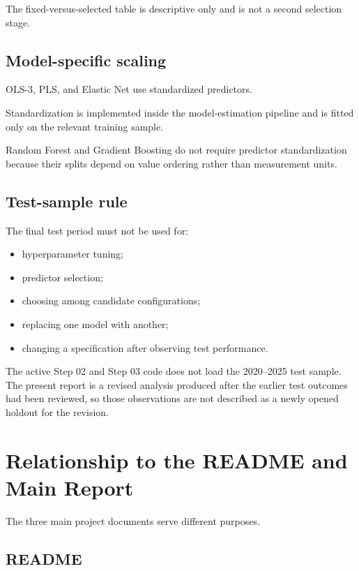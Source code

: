 \documentclass[11pt,a4paper]{article}
\begin{document}
The fixed-versus-selected table is descriptive only and is not a second
selection stage.

\subsection{Model-specific scaling}

OLS-3, PLS, and Elastic Net use standardized predictors.

Standardization is implemented inside the model-estimation pipeline and is
fitted only on the relevant training sample.

Random Forest and Gradient Boosting do not require predictor standardization
because their splits depend on value ordering rather than measurement units.

\subsection{Test-sample rule}

The final test period must not be used for:

\begin{itemize}
  \item hyperparameter tuning;
  \item predictor selection;
  \item choosing among candidate configurations;
  \item replacing one model with another;
  \item changing a specification after observing test performance.
\end{itemize}

The active Step 02 and Step 03 code does not load the 2020--2025 test sample.
The present report is a revised analysis produced after the earlier test
outcomes had been reviewed, so those observations are not described as a newly
opened holdout for the revision.


\section{Relationship to the README and Main Report}

The three main project documents serve different purposes.

\subsection{README}
\end{document}
